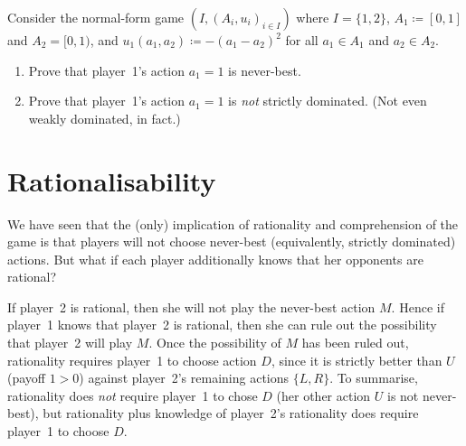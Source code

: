 \begin{exercise}
	\label{exercise:pearce_counterex}
	Consider the normal-form game $\left(I,(A_i,u_i)_{i \in I}\right)$ where $I = \{1,2\}$, $A_1 \coloneqq [0,1]$ and $A_2 = [0,1)$, and $u_1(a_1,a_2) \coloneqq - (a_1-a_2)^2$ for all $a_1 \in A_1$ and $a_2 \in A_2$.

	\begin{enumerate}[label=(\alph*)]
	
		\item Prove that player~1's action $a_1 = 1$ is never-best.

		\item Prove that player~1's action $a_1 = 1$ is \emph{not} strictly dominated. (Not even weakly dominated, in fact.)
	
	\end{enumerate}
\end{exercise}



\section{Rationalisability}
\label{dom:rbty}

We have seen that the (only) implication of rationality and comprehension of the game is that players will not choose never-best (equivalently, strictly dominated) actions. But what if each player additionally knows that her opponents are rational?

\addtocounter{example}{-2}
\begin{example}
	\label{example:rbty_neverbest_rbty}
	If player~2 is rational, then she will not play the never-best action $M$. Hence if player~1 knows that player~2 is rational, then she can rule out the possibility that player~2 will play $M$. Once the possibility of $M$ has been ruled out, rationality requires player~1 to choose action $D$, since it is strictly better than $U$ (payoff $1>0$) against player~2's remaining actions $\{L,R\}$. To summarise, rationality does \emph{not} require player~1 to chose $D$ (her other action $U$ is not never-best), but rationality plus knowledge of player~2's rationality does require player~1 to choose $D$.
\end{example}
\addtocounter{example}{1}

